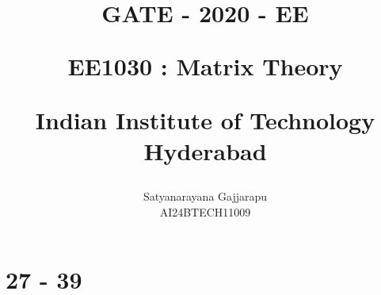 \documentclass[journal]{IEEEtran}
\begin{document}

\vspace{3cm}




\title{
GATE - 2020 - EE

\large{EE1030 : Matrix Theory}

Indian Institute of Technology Hyderabad
}
\author{Satyanarayana Gajjarapu

AI24BTECH11009
}	





\maketitle




\bigskip

\renewcommand{\thefigure}{\theenumi}
\renewcommand{\thetable}{\theenumi}


\section{27 - 39}
\end{document}
